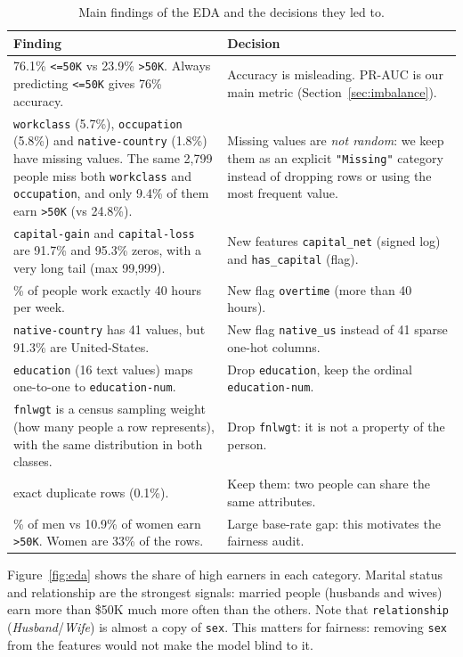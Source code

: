 \documentclass[11pt,a4paper]{article}
\begin{document}
\begin{table}[!htbp]
\centering
\small
\caption{Main findings of the EDA and the decisions they led to.}
\label{tab:eda}
\begin{tabular}{p{7.2cm}p{7.6cm}}
\toprule
\textbf{Finding} & \textbf{Decision} \\
\midrule
76.1\% \texttt{<=50K} vs 23.9\% \texttt{>50K}. Always predicting \texttt{<=50K} gives 76\% accuracy. & Accuracy is misleading. PR-AUC is our main metric (Section~\ref{sec:imbalance}). \\
\addlinespace
\texttt{workclass} (5.7\%), \texttt{occupation} (5.8\%) and \texttt{native-country} (1.8\%) have missing values. The same 2{,}799 people miss both \texttt{workclass} and \texttt{occupation}, and only 9.4\% of them earn \texttt{>50K} (vs 24.8\%). & Missing values are \emph{not random}: we keep them as an explicit \texttt{"Missing"} category instead of dropping rows or using the most frequent value. \\
\addlinespace
\texttt{capital-gain} and \texttt{capital-loss} are 91.7\% and 95.3\% zeros, with a very long tail (max 99{,}999). & New features \texttt{capital\_net} (signed log) and \texttt{has\_capital} (flag). \\
\addlinespace
46.7\% of people work exactly 40 hours per week. & New flag \texttt{overtime} (more than 40 hours). \\
\addlinespace
\texttt{native-country} has 41 values, but 91.3\% are United-States. & New flag \texttt{native\_us} instead of 41 sparse one-hot columns. \\
\addlinespace
\texttt{education} (16 text values) maps one-to-one to \texttt{education-num}. & Drop \texttt{education}, keep the ordinal \texttt{education-num}. \\
\addlinespace
\texttt{fnlwgt} is a census sampling weight (how many people a row represents), with the same distribution in both classes. & Drop \texttt{fnlwgt}: it is not a property of the person. \\
\addlinespace
52 exact duplicate rows (0.1\%). & Keep them: two people can share the same attributes. \\
\addlinespace
30.4\% of men vs 10.9\% of women earn \texttt{>50K}. Women are 33\% of the rows. & Large base-rate gap: this motivates the fairness audit. \\
\bottomrule
\end{tabular}
\end{table}

Figure~\ref{fig:eda} shows the share of high earners in each category. Marital status and relationship are the strongest signals: married people (husbands and wives) earn more than \$50K much more often than the others.
Note that \texttt{relationship} (\emph{Husband}/\emph{Wife}) is almost a copy of \texttt{sex}. This matters for fairness: removing \texttt{sex} from the features would not make the model blind to it.
\end{document}
